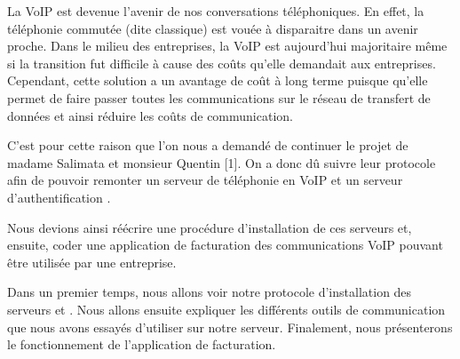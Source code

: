 
La VoIP est devenue l'avenir de nos conversations téléphoniques. En effet, la téléphonie commutée (dite classique) est vouée à disparaitre dans un avenir proche. Dans le milieu des entreprises, la VoIP est aujourd'hui majoritaire même si la transition fut difficile à cause des coûts qu'elle demandait aux entreprises. Cependant, cette solution a un avantage de coût à long terme puisque qu'elle permet de faire passer toutes les communications sur le réseau de transfert de données et ainsi réduire les coûts de communication.

C'est pour cette raison que l'on nous a demandé de continuer le projet de madame Salimata  et monsieur Quentin  [1]. On a donc dû suivre leur protocole afin de pouvoir remonter un serveur de téléphonie en VoIP {\kam} et un serveur d'authentification {\rad}.

Nous devions ainsi réécrire une procédure d'installation de ces serveurs et, ensuite, coder une application de facturation des communications VoIP pouvant être utilisée par une entreprise.

Dans un premier temps, nous allons voir notre protocole d'installation des serveurs {\kam} et {\frad}. Nous allons ensuite expliquer les différents outils de communication que nous avons essayés d'utiliser sur notre serveur. Finalement, nous présenterons le fonctionnement de l'application de facturation.
